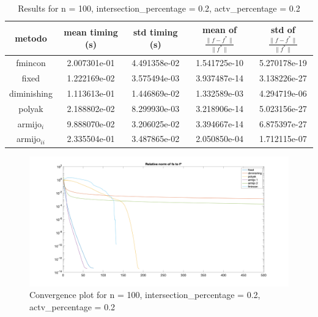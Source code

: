 
\begin{table}[H]
\setlength{\tabcolsep}{10pt} %
\renewcommand{\arraystretch}{1.2} %
\centering
\begin{tabular}{|ccccc|}
\hline
\multicolumn{1}{|c||}{metodo}   & \multicolumn{1}{c|}{mean timing (s)}    & \multicolumn{1}{c|}{std timing (s)} & \multicolumn{1}{c|}{mean of $\frac{\|f - f^*\|}{\|f^*\|}$}   & std of $\frac{\|f - f^*\|}{\|f^*\|}$ \\ \hline\hline
\multicolumn{1}{|c||}{fmincon} & \multicolumn{1}{c|}{2.007301e-01} & \multicolumn{1}{c|}{4.491358e-02}  & \multicolumn{1}{c|}{1.541725e-10} & 5.270178e-19 \\ \hline\hline
\multicolumn{1}{|c||}{fixed}       & \multicolumn{1}{c|}{1.222169e-02} & \multicolumn{1}{c|}{3.575494e-03}  & \multicolumn{1}{c|}{3.937487e-14} & 3.138226e-27  \\ \hline
\multicolumn{1}{|c||}{diminishing} & \multicolumn{1}{c|}{1.113613e-01} & \multicolumn{1}{c|}{1.446869e-02}  & \multicolumn{1}{c|}{1.332589e-03} & 4.294719e-06 \\ \hline
\multicolumn{1}{|c||}{polyak} & \multicolumn{1}{c|}{2.188802e-02} & \multicolumn{1}{c|}{8.299930e-03}  & \multicolumn{1}{c|}{3.218906e-14} & 5.023156e-27 \\ \hline
\multicolumn{1}{|c||}{armijo$_i$} & \multicolumn{1}{c|}{9.888070e-02} & \multicolumn{1}{c|}{3.206025e-02}  & \multicolumn{1}{c|}{3.394667e-14} & 6.875397e-27 \\ \hline
\multicolumn{1}{|c||}{armijo$_{ii}$} & \multicolumn{1}{c|}{2.335504e-01} & \multicolumn{1}{c|}{3.487865e-02}  & \multicolumn{1}{c|}{2.050850e-04} & 1.712115e-07 \\ \hline
\end{tabular}
\caption{Results for n = 100, intersection\_percentage = 0.2, actv\_percentage = 0.2}
\label{tab:100_zerodue_zerodue}
\end{table}


\begin{figure}[H]
\centering
    \includegraphics[width=20cm, center]{./plots/plot_100_zerodue_zerodue.png}
    \caption{Convergence plot for n = 100, intersection\_percentage = 0.2, actv\_percentage = 0.2}
    \label{fig:100_zerodue_zerodue}
\end{figure} 




